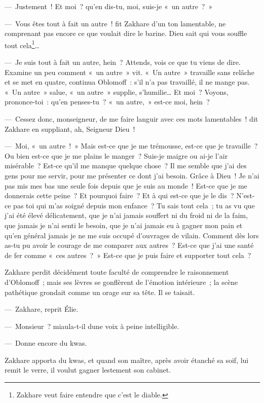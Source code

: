 \documentclass[french,twoside]{book} %
\begin{document}
— Justement ! Et moi ? qu’en dis-tu, moi, suis-je « un autre ? »\par
— Vous êtes tout à fait un autre ! fit Zakhare d’un ton lamentable, ne comprenant pas encore ce que voulait dire le barine. Dieu sait qui vous souffle tout cela\footnote{Zakhare veut faire entendre que c’est le diable.}…\par
— Je suis tout à fait un autre, hein ? Attends, vois ce que tu viens de dire. Examine un peu comment « un autre » vit. « Un autre » travaille sans relâche et se met en quatre, continua Oblomoff : s’il n’a pas travaillé, il ne mange pas. « Un autre » salue, « un autre » supplie, s’humilie… Et moi ? Voyons, prononce-toi : qu’en penses-tu ? « un autre, » est-ce moi, hein ?\par
— Cessez donc, monseigneur, de me faire languir avec ces mots lamentables ! dit Zakhare en suppliant, ah, Seigneur Dieu !\par
— Moi, « un autre ! » Mais est-ce que je me trémousse, est-ce que je travaille ? Ou bien est-ce que je me plains le manger ? Suis-je maigre ou ai-je l’air misérable ? Est-ce qu’il me manque quelque chose ? Il me semble que j’ai des gens pour me servir, pour me présenter ce dont j’ai besoin. Grâce à Dieu ! Je n’ai pas mis mes bas une seule fois depuis que je suis au monde ! Est-ce que je me donnerais cette peine ? Et pourquoi faire ? Et à qui est-ce que je le dis ? N’est-ce pas toi qui m’as soigné depuis mon enfance ? Tu sais tout cela ; tu as vu que j’ai été élevé délicatement, que je n’ai jamais souffert ni du froid ni de la faim, que jamais je n’ai senti le besoin, que je n’ai jamais eu à gagner mon pain et qu’en général jamais je ne me suis occupé d’ouvrages de vilain. Comment dès lors as-tu pu avoir le courage de me comparer aux autres ? Est-ce que j’ai une santé de fer comme « ces autres ? » Est-ce que je puis faire et supporter tout cela ?\par
Zakhare perdit décidément toute faculté de comprendre le raisonnement d’Oblomoff ; mais ses lèvres se gonflèrent de l’émotion intérieure ; la scène pathétique grondait comme un orage sur sa tête. Il se taisait.\par
— Zakhare, reprit Élie.\par
— Monsieur ? miaula-t-il dune voix à peine intelligible.\par
— Donne encore du kwas.\par
Zakhare apporta du kwas, et quand son maître, après avoir étanché sa soif, lui remit le verre, il voulut gagner lestement son cabinet.\par
\end{document}

